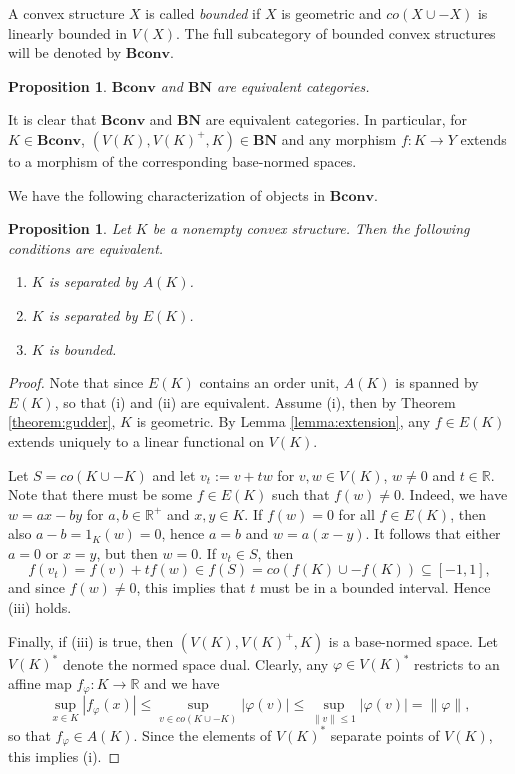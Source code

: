 \documentclass[12pt,letterpaper]{article}
\newtheorem{proposition}[lemma]{Proposition}
\newcommand{\ct}[1]{\mathbf{#1}}
\begin{document}
A convex structure $X$ is called \emph{bounded} if $X$ is geometric and $co(X\cup -X)$ is linearly bounded in $V(X)$.
 The full subcategory of  bounded convex structures will be denoted by $\ct{Bconv}$. 

\begin{proposition} $\ct{Bconv}$ and $\ct{BN}$ are equivalent categories.

\end{proposition}



It is clear that $\ct{Bconv}$ and $\ct{BN}$ are equivalent categories. In particular,
for $K\in \ct{Bconv}$, $(V(K),V(K)^+,K)\in \ct{BN}$ and any morphism $f:K\to Y$ extends to a morphism of the corresponding base-normed spaces. 


We have the following characterization of objects in $\ct{Bconv}$.
\begin{proposition}\label{prop:bounded} Let $K$ be a nonempty convex structure. Then the following conditions  are equivalent.
\begin{enumerate}
\item[(i)] $K$ is separated by $A(K)$.
\item[(ii)] $K$ is separated by $E(K)$.
\item[(iii)] $K$ is bounded.
\end{enumerate}

\end{proposition}


\begin{proof} Note that since $E(K)$ contains an order unit, $A(K)$ is spanned by $E(K)$, so that (i) and (ii) are equivalent. Assume 
(i), then by Theorem \ref{theorem:gudder}, $K$ is geometric. By Lemma \ref{lemma:extension}, any $f\in E(K)$ extends uniquely to a linear functional on $V(K)$. 

Let $S=co(K\cup -K)$ and let $v_t:=v+tw$ for $v,w\in V(K)$, $w\ne 0$ and $t\in \mathbb R$. 
Note that there must be some $f\in E(K)$ such that $f(w)\ne0$. Indeed, we have $w=ax-by$ for $a,b\in \mathbb R^+$ and $x,y\in K$. If $f(w)=0$ for all $f\in E(K)$, 
 then also $a-b=1_K(w)=0$, hence $a=b$ and $w=a(x-y)$. It follows that either $a=0$ or $x=y$, but then $w=0$. If $v_t\in S$, 
  then 
  \[
  f(v_t)=f(v)+tf(w)\in f(S)=co(f(K)\cup -f(K))\subseteq [-1,1],
  \]
   and since $f(w)\ne 0$, this implies that $t$ must be in a bounded interval. Hence (iii) holds. 

Finally, if (iii) is true, then $(V(K), V(K)^+, K)$ is a base-normed space. Let $V(K)^*$ denote the normed space dual. 
Clearly, any $\varphi\in V(K)^*$ restricts to an affine map 
$f_\varphi:K\to \mathbb R$ and  we have
\begin{equation}\label{eq:dualnorm}
\sup_{x\in K} |f_\varphi(x)|\le \sup_{v\in co(K\cup -K)}|\varphi(v)|\le \sup_{\|v\|\le 1}|\varphi(v)|=\|\varphi\|,
\end{equation}
so that $f_\varphi\in A(K)$. Since the elements of $V(K)^*$ separate points of $V(K)$, this implies (i).


\end{proof}
\end{document}
